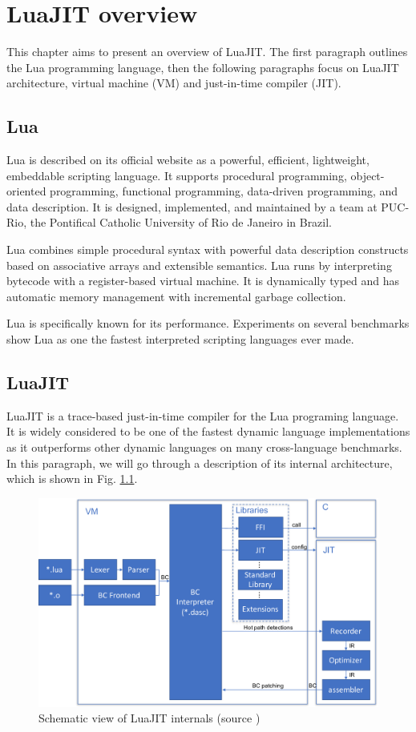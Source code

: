 \chapter{LuaJIT overview}

This chapter aims to present an overview of LuaJIT. The first paragraph outlines the Lua programming language, then the following paragraphs focus on LuaJIT architecture, virtual machine (VM) and just-in-time compiler (JIT).

\section{Lua}
Lua is described on its official website \cite{lua-programming} as a powerful, efficient, lightweight, embeddable scripting language. It supports procedural programming, object-oriented programming, functional programming, data-driven programming, and data description. It is designed, implemented, and maintained by a team at PUC-Rio, the Pontifical Catholic University of Rio de Janeiro in Brazil.
 
Lua combines simple procedural syntax with powerful data description constructs based on associative arrays and extensible semantics. Lua runs by interpreting bytecode with a register-based virtual machine. It is dynamically typed and has automatic memory management with incremental garbage collection.

Lua is specifically known for its performance. Experiments on several benchmarks show Lua as one the fastest interpreted scripting languages ever made.

\section{LuaJIT}
LuaJIT \cite{pall2012luajit} is a trace-based 
just-in-time compiler for the Lua programing language. It is widely considered to be one of the fastest dynamic language implementations as it outperforms other dynamic languages on many cross-language benchmarks.
In this paragraph, we will go through a description of its internal architecture, which is shown in Fig. \ref{fig:schematic-luajit}.
 
\begin{figure}[H]
    \centering
	\includegraphics[width=\textwidth]{images/chapter1/LuaJIT-schematic.pdf}
    \caption{Schematic view of LuaJIT internals (source \cite{bloch2018madng})}
    \label{fig:schematic-luajit}
\end{figure}


